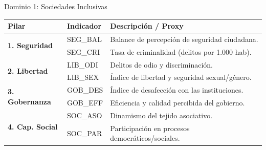\documentclass[10pt, aspectratio=169]{beamer}
\begin{document}
\begin{frame}{Dominio 1: Sociedades Inclusivas}
    \small
    \begin{table}[]
        \centering
        \begin{tabular}{llp{7cm}}
            \toprule
            \textbf{Pilar} & \textbf{Indicador} & \textbf{Descripción / Proxy} \\
            \midrule
            \multirow{2}{*}{\textbf{1. Seguridad}} & SEG\_BAL & Balance de percepción de seguridad ciudadana. \\
                                                  & SEG\_CRI & Tasa de criminalidad (delitos por 1.000 hab). \\
            \midrule
            \multirow{2}{*}{\textbf{2. Libertad}}  & LIB\_ODI & Delitos de odio y discriminación. \\
                                                  & LIB\_SEX & Índice de libertad y seguridad sexual/género. \\
            \midrule
            \multirow{2}{*}{\textbf{3. Gobernanza}} & GOB\_DES & Índice de desafección con las instituciones. \\
                                                  & GOB\_EFF & Eficiencia y calidad percibida del gobierno. \\
            \midrule
            \multirow{2}{*}{\textbf{4. Cap. Social}} & SOC\_ASO & Dinamismo del tejido asociativo. \\
                                                  & SOC\_PAR & Participación en procesos democráticos/sociales. \\
            \bottomrule
        \end{tabular}
    \end{table}
\end{frame}
\end{document}
